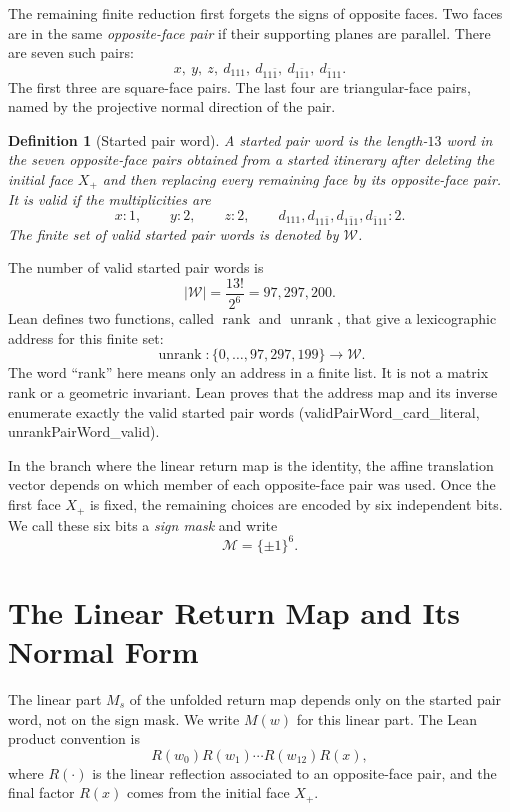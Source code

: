 \documentclass[11pt]{article}
\newtheorem{definition}[theorem]{Definition}
\newcommand{\W}{\mathcal W}
\newcommand{\Masks}{\mathcal M}
\newcommand{\rank}{\operatorname{rank}}
\newcommand{\unrank}{\operatorname{unrank}}
\newcommand{\leanref}[1]{{\small\ttfamily #1}}
\begin{document}
The remaining finite reduction first forgets the signs of opposite faces.  Two
faces are in the same \emph{opposite-face pair} if their supporting planes
are parallel.  There are seven such pairs:
\[
x,\ y,\ z,\ d_{111},\ d_{11\bar 1},\ d_{1\bar 1 1},\
d_{\bar 1 11}.
\]
The first three are square-face pairs.  The last four are triangular-face
pairs, named by the projective normal direction of the pair.

\begin{definition}[Started pair word]
A \emph{started pair word} is the length-\(13\) word in the seven
opposite-face pairs obtained from a started itinerary after deleting the
initial face \(X_+\) and then replacing every remaining face by its
opposite-face pair.  It is \emph{valid} if the multiplicities are
\[
x:1,\qquad y:2,\qquad z:2,\qquad
d_{111},d_{11\bar 1},d_{1\bar 1 1},d_{\bar 1 11}:2.
\]
The finite set of valid started pair words is denoted by \(\W\).
\end{definition}

The number of valid started pair words is
\[
  |\W|=\frac{13!}{2^6}=97{,}297{,}200.
\]
Lean defines two functions, called \(\rank\) and \(\unrank\), that give a
lexicographic address for this finite set:
\[
  \unrank:\{0,\ldots,97{,}297{,}199\}\to\W.
\]
The word ``rank'' here means only an address in a finite list.  It is not a
matrix rank or a geometric invariant.  Lean proves that the address map and
its inverse enumerate exactly the valid started pair words
(\leanref{validPairWord\_card\_literal}, \leanref{unrankPairWord\_valid}).

In the branch where the linear return map is the identity, the affine
translation vector depends on which member of each opposite-face pair was
used.  Once the first face \(X_+\) is fixed, the remaining choices are encoded
by six independent bits.  We call these six bits a \emph{sign mask} and write
\[
  \Masks=\{\pm1\}^6.
\]

\section{The Linear Return Map and Its Normal Form}
\label{sec:holonomy}

The linear part \(M_s\) of the unfolded return map depends only on the started
pair word, not on the sign mask.  We write \(M(w)\) for this linear part.  The
Lean product convention is
\[
  R(w_0)R(w_1)\cdots R(w_{12})R(x),
\]
where \(R(\cdot)\) is the linear reflection associated to an opposite-face
pair, and the final factor \(R(x)\) comes from the initial face \(X_+\).
\end{document}
